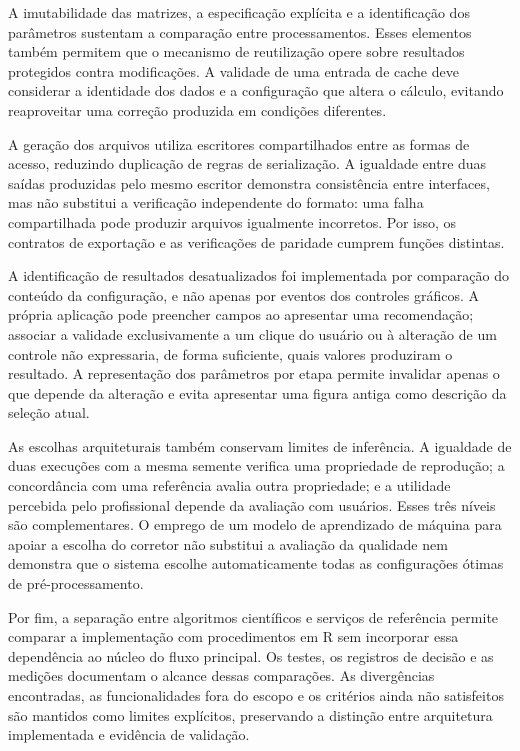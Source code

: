A imutabilidade das matrizes, a especificação explícita e a identificação dos parâmetros sustentam a comparação entre processamentos. Esses elementos também permitem que o mecanismo de reutilização opere sobre resultados protegidos contra modificações. A validade de uma entrada de cache deve considerar a identidade dos dados e a configuração que altera o cálculo, evitando reaproveitar uma correção produzida em condições diferentes.

A geração dos arquivos utiliza escritores compartilhados entre as formas de acesso, reduzindo duplicação de regras de serialização. A igualdade entre duas saídas produzidas pelo mesmo escritor demonstra consistência entre interfaces, mas não substitui a verificação independente do formato: uma falha compartilhada pode produzir arquivos igualmente incorretos. Por isso, os contratos de exportação e as verificações de paridade cumprem funções distintas.

A identificação de resultados desatualizados foi implementada por comparação do conteúdo da configuração, e não apenas por eventos dos controles gráficos. A própria aplicação pode preencher campos ao apresentar uma recomendação; associar a validade exclusivamente a um clique do usuário ou à alteração de um controle não expressaria, de forma suficiente, quais valores produziram o resultado. A representação dos parâmetros por etapa permite invalidar apenas o que depende da alteração e evita apresentar uma figura antiga como descrição da seleção atual.

As escolhas arquiteturais também conservam limites de inferência. A igualdade de duas execuções com a mesma semente verifica uma propriedade de reprodução; a concordância com uma referência avalia outra propriedade; e a utilidade percebida pelo profissional depende da avaliação com usuários. Esses três níveis são complementares. O emprego de um modelo de aprendizado de máquina para apoiar a escolha do corretor não substitui a avaliação da qualidade nem demonstra que o sistema escolhe automaticamente todas as configurações ótimas de pré-processamento.

Por fim, a separação entre algoritmos científicos e serviços de referência permite comparar a implementação com procedimentos em R sem incorporar essa dependência ao núcleo do fluxo principal. Os testes, os registros de decisão e as medições documentam o alcance dessas comparações. As divergências encontradas, as funcionalidades fora do escopo e os critérios ainda não satisfeitos são mantidos como limites explícitos, preservando a distinção entre arquitetura implementada e evidência de validação.

